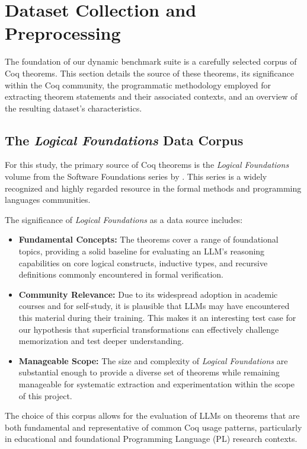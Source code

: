 
\section{Dataset Collection and Preprocessing}
\label{sec:dataset_collection_preprocessing}

The foundation of our dynamic benchmark suite is a carefully selected corpus of Coq theorems. This section details the source of these theorems, its significance within the Coq community, the programmatic methodology employed for extracting theorem statements and their associated contexts, and an overview of the resulting dataset's characteristics.

\subsection{The \emph{Logical Foundations} Data Corpus}
\label{sec:data_corpus}

For this study, the primary source of Coq theorems is the \emph{Logical Foundations} volume from the Software Foundations series by \citet{PierceSF:LF2024}. This series is a widely recognized and highly regarded resource in the formal methods and programming languages communities.

The significance of \emph{Logical Foundations} as a data source includes:
\begin{itemize}
    \item \textbf{Fundamental Concepts:} The theorems cover a range of foundational topics, providing a solid baseline for evaluating an LLM's reasoning capabilities on core logical constructs, inductive types, and recursive definitions commonly encountered in formal verification.
    \item \textbf{Community Relevance:} Due to its widespread adoption in academic courses and for self-study, it is plausible that LLMs may have encountered this material during their training. This makes it an interesting test case for our hypothesis that superficial transformations can effectively challenge memorization and test deeper understanding.
    \item \textbf{Manageable Scope:} The size and complexity of \emph{Logical Foundations} are substantial enough to provide a diverse set of theorems while remaining manageable for systematic extraction and experimentation within the scope of this project.
\end{itemize}
The choice of this corpus allows for the evaluation of LLMs on theorems that are both fundamental and representative of common Coq usage patterns, particularly in educational and foundational Programming Language (PL) research contexts.


